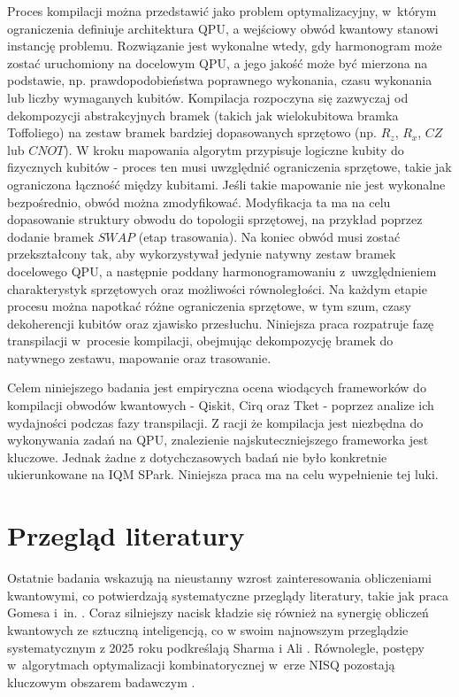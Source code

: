 Proces kompilacji można przedstawić jako problem optymalizacyjny, w~którym ograniczenia definiuje architektura QPU, a wejściowy obwód kwantowy stanowi instancję problemu. Rozwiązanie jest wykonalne wtedy, gdy harmonogram może zostać uruchomiony na docelowym QPU, a jego jakość może być mierzona na podstawie, np. prawdopodobieństwa poprawnego wykonania, czasu wykonania lub liczby wymaganych kubitów. Kompilacja rozpoczyna się zazwyczaj od dekompozycji abstrakcyjnych bramek (takich jak wielokubitowa bramka Toffoliego) na zestaw bramek bardziej dopasowanych sprzętowo (np. $R_z$, $R_x$, $\mathit{CZ}$ lub $\mathit{CNOT}$). W kroku mapowania algorytm przypisuje logiczne kubity do fizycznych kubitów - proces ten musi uwzględnić ograniczenia sprzętowe, takie jak ograniczona łączność między kubitami. Jeśli takie mapowanie nie jest wykonalne bezpośrednio, obwód można zmodyfikować. Modyfikacja ta ma na celu dopasowanie struktury obwodu do topologii sprzętowej, na przykład poprzez dodanie bramek $\mathit{SWAP}$ (etap trasowania). Na koniec obwód musi zostać przekształcony tak, aby wykorzystywał jedynie natywny zestaw bramek docelowego QPU, a następnie poddany harmonogramowaniu z~uwzględnieniem charakterystyk sprzętowych oraz możliwości równoległości. Na każdym etapie procesu można napotkać różne ograniczenia sprzętowe, w tym szum, czasy dekoherencji kubitów oraz zjawisko przesłuchu. Niniejsza praca rozpatruje fazę transpilacji w~procesie kompilacji, obejmując dekompozycję bramek do natywnego zestawu, mapowanie oraz trasowanie.

Celem niniejszego badania jest empiryczna ocena wiodących frameworków do kompilacji obwodów kwantowych - Qiskit, Cirq oraz Tket - poprzez analize ich wydajności podczas fazy transpilacji. Z racji że kompilacja jest niezbędna do wykonywania zadań na QPU, znalezienie najskuteczniejszego frameworka jest kluczowe. Jednak żadne z dotychczasowych badań nie było konkretnie ukierunkowane na IQM SPark. Niniejsza praca ma na celu wypełnienie tej luki. 

\section{Przegląd literatury}
\label{sec:literature-review}

Ostatnie badania wskazują na nieustanny wzrost zainteresowania obliczeniami kwantowymi, co potwierdzają systematyczne przeglądy literatury, takie jak praca Gomesa i~in. \cite{Gomes2024}. Coraz silniejszy nacisk kładzie się również na synergię obliczeń kwantowych ze sztuczną inteligencją, co w swoim najnowszym przeglądzie systematycznym z 2025 roku podkreślają Sharma i Ali \cite{sharma_integration_2025}. Równolegle, postępy w~algorytmach optymalizacji kombinatorycznej w~erze NISQ pozostają kluczowym obszarem badawczym \cite{Gemeinhardt2023}.

